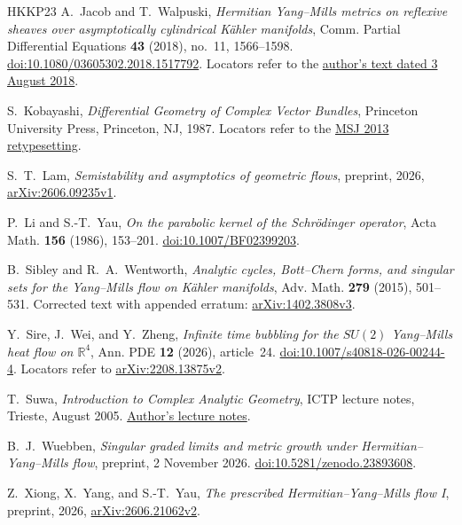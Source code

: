 \begin{thebibliography}{HKKP23}
A.~Jacob and T.~Walpuski,
\emph{Hermitian Yang--Mills metrics on reflexive sheaves over asymptotically cylindrical K\"ahler manifolds},
Comm. Partial Differential Equations \textbf{43} (2018), no.~11, 1566--1598.
\href{https://doi.org/10.1080/03605302.2018.1517792}{doi:10.1080/03605302.2018.1517792}.
Locators refer to the \href{https://walpu.ski/Research/ACylDUY.pdf}{author's text dated 3 August 2018}.

S.~Kobayashi, \emph{Differential Geometry of Complex Vector Bundles},
Princeton University Press, Princeton, NJ, 1987.
Locators refer to the \href{https://www.mathsoc.jp/assets/pdf/publications/pubmsj/Vol15.pdf}{MSJ 2013 retypesetting}.

S.~T.~Lam, \emph{Semistability and asymptotics of geometric flows},
preprint, 2026, \href{https://arxiv.org/abs/2606.09235v1}{arXiv:2606.09235v1}.

P.~Li and S.-T.~Yau, \emph{On the parabolic kernel of the Schr\"odinger operator},
Acta Math. \textbf{156} (1986), 153--201.
\href{https://doi.org/10.1007/BF02399203}{doi:10.1007/BF02399203}.

B.~Sibley and R.~A.~Wentworth,
\emph{Analytic cycles, Bott--Chern forms, and singular sets for the Yang--Mills flow on K\"ahler manifolds},
Adv. Math. \textbf{279} (2015), 501--531.
Corrected text with appended erratum:
\href{https://arxiv.org/abs/1402.3808v3}{arXiv:1402.3808v3}.

Y.~Sire, J.~Wei, and Y.~Zheng,
\emph{Infinite time bubbling for the $SU(2)$ Yang--Mills heat flow on $\mathbb R^4$},
Ann. PDE \textbf{12} (2026), article~24.
\href{https://doi.org/10.1007/s40818-026-00244-4}{doi:10.1007/s40818-026-00244-4}.
Locators refer to \href{https://arxiv.org/abs/2208.13875v2}{arXiv:2208.13875v2}.

T.~Suwa, \emph{Introduction to Complex Analytic Geometry},
ICTP lecture notes, Trieste, August 2005.
\href{https://indico.ictp.it/event/a04204/session/7/contribution/5/material/0/0.pdf}{Author's lecture notes}.

B.~J.~Wuebben, \emph{Singular graded limits and metric growth under Hermitian--Yang--Mills flow},
preprint, 2 November 2026.
\href{https://doi.org/10.5281/zenodo.23893608}{doi:10.5281/zenodo.23893608}.

Z.~Xiong, X.~Yang, and S.-T.~Yau,
\emph{The prescribed Hermitian--Yang--Mills flow I},
preprint, 2026, \href{https://arxiv.org/abs/2606.21062v2}{arXiv:2606.21062v2}.

\end{thebibliography}
